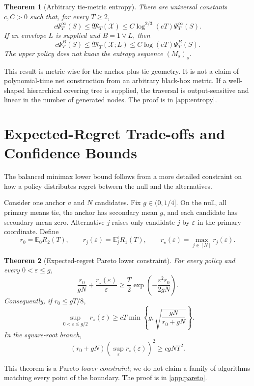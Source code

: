\documentclass[11pt]{article}
\newtheorem{theorem}{Theorem}[section]
\theoremstyle{definition}
\newcommand{\X}{\mathcal X}
\newcommand{\E}{\mathbb E}
\newcommand{\eps}{\varepsilon}
\begin{document}
\begin{theorem}[Arbitrary tie-metric entropy]
\label{thm:entropy}
There are universal constants $c,C>0$ such that, for every $T\ge2$,
\[
  c\Psi_T^\infty(S)
  \le \mathfrak M_T(\X)
  \le C\log^{2/3}(eT)\Psi_T^\infty(S).
\]
If an envelope $L$ is supplied and $B=1\vee L$, then
\[
  c\Psi_T^B(S)
  \le \mathfrak M_T(\X;L)
  \le C\log(eT)\Psi_T^B(S).
\]
The upper policy does not know the entropy sequence $(M_s)_s$.
\end{theorem}

This result is metric-wise for the anchor-plus-tie geometry.  It is not a claim of polynomial-time net construction from an arbitrary black-box metric.  If a well-shaped hierarchical covering tree is supplied, the traversal is output-sensitive and linear in the number of generated nodes.  The proof is in \cref{app:entropy}.

\section{Expected-Regret Trade-offs and Confidence Bounds}
\label{sec:frontiers}

The balanced minimax lower bound follows from a more detailed constraint on how a policy distributes regret between the null and the alternatives.

Consider one anchor $a$ and $N$ candidates.  Fix $g\in(0,1/4]$.  On the null, all primary means tie, the anchor has secondary mean $g$, and each candidate has secondary mean zero.  Alternative $j$ raises only candidate $j$ by $\eps$ in the primary coordinate.  Define
\[
  r_0=\E_0R_2(T),
  \qquad
  r_j(\eps)=\E_j^\eps R_1(T),
  \qquad
  r_\star(\eps)=\max_{j\in[N]}r_j(\eps).
\]

\begin{theorem}[Expected-regret Pareto lower constraint]
\label{thm:pareto}
For every policy and every $0<\eps\le g$,
\[
  \boxed{
  \frac{r_0}{gN}
  +\frac{r_\star(\eps)}{\eps}
  \ge
  \frac T2
  \exp\left(-\frac{\eps^2r_0}{2gN}\right).}
\]
Consequently, if $r_0\le gT/8$,
\[
  \sup_{0<\eps\le g/2}r_\star(\eps)
  \ge
  cT\min\left\{
    g,
    \sqrt{\frac{gN}{r_0+gN}}
  \right\}.
\]
In the square-root branch,
\[
  (r_0+gN)
  \left(\sup_{\eps}r_\star(\eps)\right)^2
  \ge cgNT^2.
\]
\end{theorem}

This theorem is a Pareto \emph{lower constraint}; we do not claim a family of algorithms matching every point of the boundary.  The proof is in \cref{app:pareto}.
\end{document}
